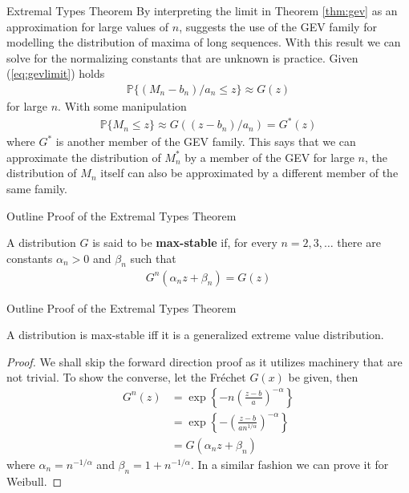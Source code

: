 \documentclass[10pt]{beamer}
\begin{document}
\begin{frame}{Extremal Types Theorem}
By interpreting the limit in Theorem \ref{thm:gev} as an approximation for large values of $n$, suggests the use of the GEV family for modelling the distribution of maxima of long sequences. With this result we can solve for the normalizing constants that are unknown is practice. Given (\ref{eq:gevlimit}) holds
\begin{align*}
\mathbb{P}\{(M_n-b_n)/a_n\leq z\} \approx G(z)
\end{align*}
for large $n$. With some manipulation 
\begin{align*}
\mathbb{P}\{M_n\leq z\} \approx G((z-b_n)/a_n) = G^\ast(z)
\end{align*}
where $G^\ast$ is another member of the GEV family. This says that we can approximate the distribution of $M_n^\ast$ by a member of the GEV for large $n$, the distribution of $M_n$ itself can also be approximated by a different member of the same family.
\end{frame}

\begin{frame}{Outline Proof of the Extremal Types Theorem}
\begin{definition}
A distribution $G$ is said to be \textbf{max-stable} if, for every $n=2,3,\ldots$ there are constants $\alpha_n>0$ and $\beta_n$ such that
\begin{align*}
G^n(\alpha_nz+\beta_n) = G(z)
\end{align*}
\end{definition}
\end{frame}

\begin{frame}{Outline Proof of the Extremal Types Theorem}
\begin{theorem}\label{thm:maxstablegev}
A distribution is max-stable iff it is a generalized extreme value distribution.
\begin{proof}
We shall skip the forward direction proof as it utilizes machinery that are not trivial. To show the converse, let the Fr\'echet $G(x)$ be given, then 	
\begin{align*}
G^n(z) &= \exp\left\{-n\left(\frac{z-b}{a}\right)^{-\alpha}\right\}\\
&= \exp\left\{-\left(\frac{z-b}{an^{1/\alpha}}\right)^{-\alpha}\right\}\\
&=G(\alpha_nz+\beta_n)
\end{align*}
where $\alpha_n = n^{-1/\alpha}$ and $\beta_n = 1 +  n^{-1/\alpha}$. In a similar fashion we can prove it for Weibull. 
\end{proof}
\end{theorem}
\end{frame}
\end{document}
